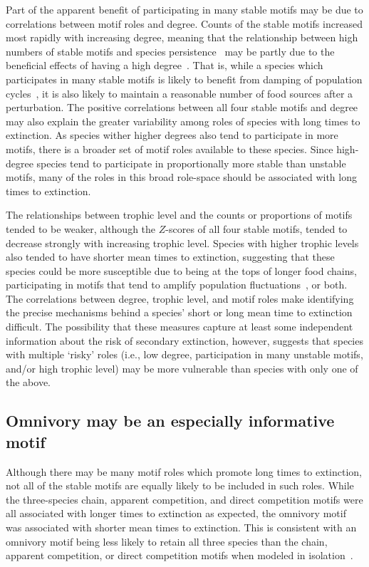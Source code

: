 \documentclass[12pt]{article}
\begin{document}
        
        Part of the apparent benefit of participating in many stable motifs may be due to correlations between motif roles and degree.
        Counts of the stable motifs increased most rapidly with increasing degree, meaning that the relationship between high numbers of stable motifs and species persistence~\citep{Stouffer2007,Borrelli2015a} may be partly due to the beneficial effects of having a high degree~\citep{Cirtwill2016a}.
		That is, while a species which participates in many stable motifs is likely to benefit from damping of population cycles~\citep{Borrelli2015a}, it is also likely to maintain a reasonable number of food sources after a perturbation.
		The positive correlations between all four stable motifs and degree may also explain the greater variability among roles of species with long times to extinction.
		As species wither higher degrees also tend to participate in more motifs, there is a broader set of motif roles available to these species.
		Since high-degree species tend to participate in proportionally more stable than unstable motifs, many of the roles in this broad role-space should be associated with long times to extinction.
		
		
        The relationships between trophic level and the counts or proportions of motifs tended to be weaker, although the $Z$-scores of all four stable motifs, tended to decrease strongly with increasing trophic level.
        Species with higher trophic levels also tended to have shorter mean times to extinction, suggesting that these species could be more susceptible due to being at the tops of longer food chains, participating in motifs that tend to amplify population fluctuations~\citep{Borrelli2015a}, or both.
        The correlations between degree, trophic level, and motif roles make identifying the precise mechanisms behind a species' short or long mean time to extinction difficult.
        The possibility that these measures capture at least some independent information about the risk of secondary extinction, however, suggests that species with multiple `risky' roles (i.e., low degree, participation in many unstable motifs, and/or high trophic level) may be more vulnerable than species with only one of the above.

        
    \subsection*{Omnivory may be an especially informative motif}
	    
        Although there may be many motif roles which promote long times to extinction, not all of the stable motifs are equally likely to be included in such roles.
        While the three-species chain, apparent competition, and direct competition motifs were all associated with longer times to extinction as expected, the omnivory motif was associated with shorter mean times to extinction. 
        This is consistent with an omnivory motif being less likely to retain all three species than the chain, apparent competition, or direct competition motifs when modeled in isolation~\citep{Borrelli2015a}. 
\end{document}

